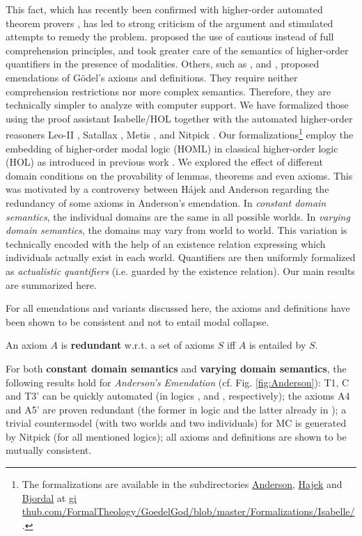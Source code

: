 \documentclass{birkjour}
\theoremstyle{definition}
\theoremstyle{remark}
\numberwithin{equation}{section}
\begin{document}
This fact, which
has recently been confirmed with higher-order automated theorem
provers \citep{C40,J30}, has led to strong criticism of the argument
and stimulated attempts to remedy the problem.
\citet{Hajek_Magari_and_others_1996,Hajek_der_Mathematiker_2001}
proposed the use of cautious instead of full comprehension principles,
and \citet{fitting02:_types_tableaus_god} took
greater care of the semantics of higher-order quantifiers
in the presence of modalities. Others, such as
\citet{anderson90:_some_emend_of_goedel_ontol_proof}, \citet{Hajek2002}
and \citet{bjordal99}, proposed emendations of G\"odel's
axioms and definitions. They require neither comprehension
restrictions nor more complex semantics. Therefore, they are
technically simpler to analyze with computer support. We have
formalized those using the proof assistant Isabelle/HOL \citep{Isabelle}
together with the automated higher-order reasoners Leo-II \citep{C26},
Satallax \citep{brown2012satallax}, Metis
\citep{Hurd03first-orderproof}, and Nitpick \citep{Nitpick}.   Our
formalizations\footnote{The   formalizations are available in the
subdirectories \url{Anderson}, \url{Hajek} and \url{Bjordal} at \url{gi
thub.com/FormalTheology/GoedelGod/blob/master/Formalizations/Isabelle/
}.} employ the embedding of higher-order modal logic (HOML) in
classical higher-order logic (HOL) as introduced in previous work
\citep{C40,J30,J23}. We explored the effect of different domain
conditions on the provability of lemmas, theorems and even axioms.
This was motivated by a controversy between Hájek and Anderson
regarding the redundancy of some axioms in Anderson's emendation. In
\emph{constant domain semantics}, the individual domains are the same
in all possible worlds. In \emph{varying domain semantics}, the
domains may vary from world to world. This variation is technically
encoded with the help of an existence relation expressing which
individuals actually exist in each world. Quantifiers are then
uniformly formalized as \emph{actualistic quantifiers} (i.e. guarded by
the existence relation). Our main results are summarized here.

For all emendations and variants discussed here, the axioms and
definitions have been shown to be consistent and not to entail modal
collapse.

\begin{definition}
An axiom $A$ is \textbf{redundant} w.r.t. a set of axioms $S$ iff $A$ is
entailed by $S$. \end{definition}

For both \textbf{constant domain semantics} and \textbf{varying domain
semantics}, the following results hold for \emph{Anderson's
Emendation} (cf. Fig. \ref{fig:Anderson}): T1, C
and T3' can be quickly automated (in logics \K, \K and \KB,
respectively); the axioms A4 and A5' are proven redundant (the former in logic \KFourB and the latter
already in \K); a trivial countermodel (with two worlds and  two
individuals) for MC is generated by Nitpick (for all mentioned
logics); all axioms and definitions are shown to be mutually
consistent.
\end{document}
